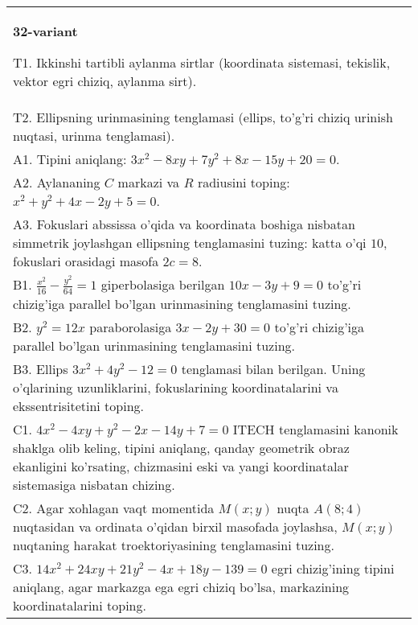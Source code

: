 \documentclass{article}
\begin{document}
\begin{tabular}{m{17cm}}
\textbf{32-variant}
\newline

T1. Ikkinshi tartibli aylanma sirtlar (koordinata sistemasi, tekislik, vektor egri chiziq, aylanma sirt).\\

T2. Ellipsning urinmasining tenglamasi (ellips, to'g'ri chiziq urinish nuqtasi, urinma tenglamasi).\\

A1. Tipini aniqlang: $3x^{2}-8xy+7y^{2}+8x-15y+20=0$.\\

A2. Aylananing $C$ markazi va $R$ radiusini toping: $x^2+y^2+4x-2y+5=0$.\\

A3. Fokuslari abssissa o'qida va koordinata boshiga nisbatan simmetrik joylashgan ellipsning tenglamasini tuzing: katta o'qi $10$, fokuslari orasidagi masofa $2c=8$.\\

B1. $\frac{x^{2}}{16} - \frac{y^{2}}{64} = 1$ giperbolasiga berilgan $10x - 3y + 9 = 0$ to'g'ri chizig'iga parallel bo'lgan urinmasining tenglamasini tuzing.  \\

B2. $y^{2} = 12x$ paraborolasiga $3x - 2y + 30 = 0$ to'g'ri chizig'iga parallel bo'lgan urinmasining tenglamasini tuzing.  \\

B3. Ellips $3x^{2} + 4y^{2} - 12 = 0$ tenglamasi bilan berilgan. Uning o'qlarining uzunliklarini, fokuslarining koordinatalarini va ekssentrisitetini toping.  \\

C1. $4x^{2} - 4xy + y^{2} - 2x - 14y + 7 = 0$ ITECH tenglamasini kanonik shaklga olib keling, tipini aniqlang, qanday geometrik obraz ekanligini ko'rsating, chizmasini eski va yangi koordinatalar sistemasiga nisbatan chizing.  \\

C2. Agar xohlagan vaqt momentida $M(x;y)$ nuqta $A(8;4)$ nuqtasidan va ordinata o'qidan birxil masofada joylashsa, $M(x;y)$ nuqtaning harakat troektoriyasining tenglamasini tuzing.  \\

C3. $14x^{2} + 24xy + 21y^{2} - 4x + 18y - 139 = 0$ egri chizig'ining tipini aniqlang, agar markazga ega egri chiziq bo'lsa, markazining koordinatalarini toping.  \\

\end{tabular}
\vspace{1cm}
\end{document}
